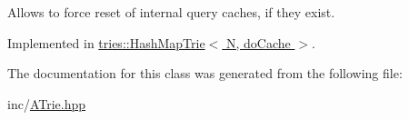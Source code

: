 Allows to force reset of internal query caches, if they exist. 



Implemented in \hyperlink{classtries_1_1_hash_map_trie_acd9d79668a9ceb0093bb42aa43eb6546}{tries\+::\+Hash\+Map\+Trie$<$ N, do\+Cache $>$}.



The documentation for this class was generated from the following file\+:\begin{DoxyCompactItemize}
\item 
inc/\hyperlink{_a_trie_8hpp}{A\+Trie.\+hpp}\end{DoxyCompactItemize}
